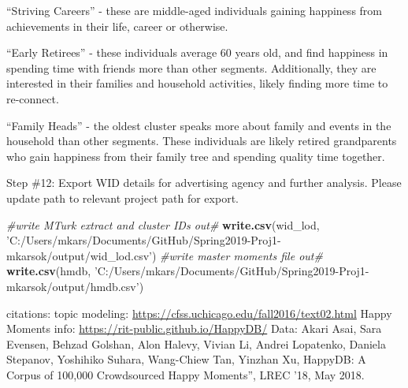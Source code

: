 \documentclass[]{article}
\newenvironment{Shaded}{\begin{snugshade}}{\end{snugshade}}
\newcommand{\KeywordTok}[1]{\textcolor[rgb]{0.13,0.29,0.53}{\textbf{#1}}}
\newcommand{\StringTok}[1]{\textcolor[rgb]{0.31,0.60,0.02}{#1}}
\newcommand{\CommentTok}[1]{\textcolor[rgb]{0.56,0.35,0.01}{\textit{#1}}}
\newcommand{\NormalTok}[1]{#1}
\begin{document}
``Striving Careers'' - these are middle-aged individuals gaining
happiness from achievements in their life, career or otherwise.

``Early Retirees'' - these individuals average 60 years old, and find
happiness in spending time with friends more than other segments.
Additionally, they are interested in their families and household
activities, likely finding more time to re-connect.

``Family Heads'' - the oldest cluster speaks more about family and
events in the household than other segments. These individuals are
likely retired grandparents who gain happiness from their family tree
and spending quality time together.

Step \#12: Export WID details for advertising agency and further
analysis. Please update path to relevant project path for export.

\begin{Shaded}
\begin{Highlighting}[]
\CommentTok{#write MTurk extract and cluster IDs out#}
\KeywordTok{write.csv}\NormalTok{(wid_lod, }\StringTok{'C:/Users/mkars/Documents/GitHub/Spring2019-Proj1-mkarsok/output/wid_lod.csv'}\NormalTok{)}
\CommentTok{#write master moments file out#}
\KeywordTok{write.csv}\NormalTok{(hmdb, }\StringTok{'C:/Users/mkars/Documents/GitHub/Spring2019-Proj1-mkarsok/output/hmdb.csv'}\NormalTok{)}
\end{Highlighting}
\end{Shaded}

citations: topic modeling:
\url{https://cfss.uchicago.edu/fall2016/text02.html} Happy Moments info:
\url{https://rit-public.github.io/HappyDB/} Data: Akari Asai, Sara
Evensen, Behzad Golshan, Alon Halevy, Vivian Li, Andrei Lopatenko,
Daniela Stepanov, Yoshihiko Suhara, Wang-Chiew Tan, Yinzhan Xu, HappyDB:
A Corpus of 100,000 Crowdsourced Happy Moments'', LREC '18, May 2018.
\end{document}
